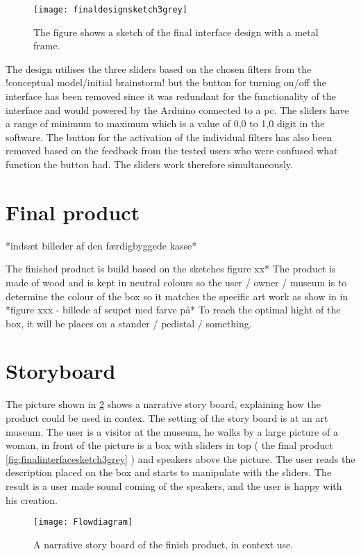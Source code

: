 \begin{figure}[!h] 
\centering
\texttt{[image: finaldesignsketch3grey]}
\caption{\label{fig:inaldesignsketch3grey} The figure shows a sketch of the final interface design with a metal frame.}
\end{figure}
  
The design utilises the three sliders based on the chosen filters from the !conceptual model/initial brainstorm! but the button for turning on/off the interface has been removed since it was redundant for the functionality of the interface and would powered by the Arduino connected to a pc. The sliders have a range of minimum to maximum which is a value of 0,0 to 1,0 digit in the software. The button for the activation of the individual filters has also been removed based on the feedback from the tested users who were confused what function the button had. The sliders work therefore simultaneously.      
 
 \section{Final product }
*indsæt billeder af den færdigbyggede kasse* 

The finished product is build based on the sketches figure xx* The product is made of wood and is kept in neutral colours so the user / owner / museum is to determine the colour of the box so it matches the specific art work as show in in *figure xxx - billede af seupet med farve på* To reach the optimal hight of the box, it will be places on a stander / pedistal / something. 


\section{Storyboard}
The picture shown in \ref{fig:Flowdiagram} shows a narrative story board, explaining how the product could be used in contex. The setting of the story board is at an art museum. The user is a visitor at the museum, he walks by a large picture of a woman, in front of the picture is a box with sliders in top ( the final product \ref{fig:finalinterfacesketch3grey} ) and speakers above the picture. The user reads the description placed on the box and starts to manipulate with the sliders. The result is a user made sound coming of the speakers, and the user is happy with his creation. 

\begin{figure}[!h] 
\centering
\texttt{[image: Flowdiagram]}
\caption{\label{fig:Flowdiagram} A narrative story board of the finish product,  in context use.}
\end{figure}





